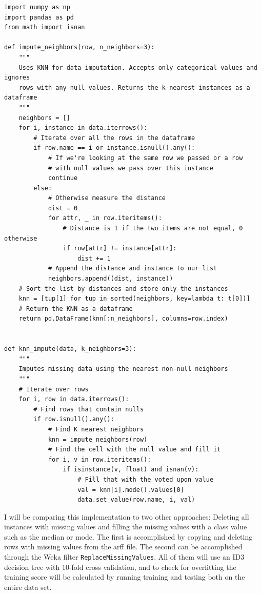 \documentclass[11pt, letterpaper]{report}
\begin{document}
\begin{verbatim}
import numpy as np
import pandas as pd
from math import isnan

def impute_neighbors(row, n_neighbors=3):
    """
    Uses KNN for data imputation. Accepts only categorical values and ignores
    rows with any null values. Returns the k-nearest instances as a dataframe
    """
    neighbors = []
    for i, instance in data.iterrows():
        # Iterate over all the rows in the dataframe
        if row.name == i or instance.isnull().any():
            # If we're looking at the same row we passed or a row
            # with null values we pass over this instance
            continue
        else:
            # Otherwise measure the distance
            dist = 0
            for attr, _ in row.iteritems():
                # Distance is 1 if the two items are not equal, 0 otherwise
                if row[attr] != instance[attr]:
                    dist += 1
            # Append the distance and instance to our list
            neighbors.append((dist, instance))
    # Sort the list by distances and store only the instances
    knn = [tup[1] for tup in sorted(neighbors, key=lambda t: t[0])]
    # Return the KNN as a dataframe
    return pd.DataFrame(knn[:n_neighbors], columns=row.index)


def knn_impute(data, k_neighbors=3):
    """
    Imputes missing data using the nearest non-null neighbors
    """
    # Iterate over rows
    for i, row in data.iterrows():
        # Find rows that contain nulls
        if row.isnull().any():
            # Find K nearest neighbors
            knn = impute_neighbors(row)
            # Find the cell with the null value and fill it
            for i, v in row.iteritems():
                if isinstance(v, float) and isnan(v):
                    # Fill that with the voted upon value
                    val = knn[i].mode().values[0]
                    data.set_value(row.name, i, val)
\end{verbatim}

I will be comparing this implementation to two other approaches: Deleting all instances with missing values and filling the missing values with a class value such as the median or mode. The first is accomplished by copying and deleting rows with missing values from the arff file. The second can be accomplished through the Weka filter \texttt{ReplaceMissingValues}. All of them will use an ID3 decision tree with 10-fold cross validation, and to check for overfitting the training score will be calculated by running training and testing both on the entire data set.
\end{document}
